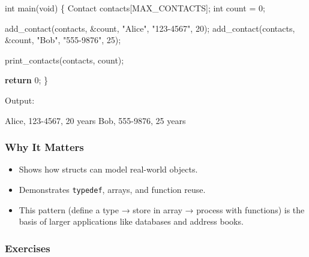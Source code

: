 \documentclass[
  letterpaper,
  DIV=11,
  numbers=noendperiod]{scrreprt}
\newenvironment{Shaded}{\begin{snugshade}}{\end{snugshade}}
\newcommand{\ControlFlowTok}[1]{\textcolor[rgb]{0.00,0.23,0.31}{\textbf{#1}}}
\newcommand{\DataTypeTok}[1]{\textcolor[rgb]{0.68,0.00,0.00}{#1}}
\newcommand{\DecValTok}[1]{\textcolor[rgb]{0.68,0.00,0.00}{#1}}
\newcommand{\ExtensionTok}[1]{\textcolor[rgb]{0.00,0.23,0.31}{#1}}
\newcommand{\NormalTok}[1]{\textcolor[rgb]{0.00,0.23,0.31}{#1}}
\newcommand{\OperatorTok}[1]{\textcolor[rgb]{0.37,0.37,0.37}{#1}}
\newcommand{\StringTok}[1]{\textcolor[rgb]{0.13,0.47,0.30}{#1}}
\providecommand{\tightlist}{%
  \setlength{\itemsep}{0pt}\setlength{\parskip}{0pt}}
\begin{document}
\begin{Shaded}
\begin{Highlighting}[]
\DataTypeTok{int}\NormalTok{ main}\OperatorTok{(}\DataTypeTok{void}\OperatorTok{)} \OperatorTok{\{}
\NormalTok{    Contact contacts}\OperatorTok{[}\NormalTok{MAX\_CONTACTS}\OperatorTok{];}
    \DataTypeTok{int}\NormalTok{ count }\OperatorTok{=} \DecValTok{0}\OperatorTok{;}

\NormalTok{    add\_contact}\OperatorTok{(}\NormalTok{contacts}\OperatorTok{,} \OperatorTok{\&}\NormalTok{count}\OperatorTok{,} \StringTok{"Alice"}\OperatorTok{,} \StringTok{"123{-}4567"}\OperatorTok{,} \DecValTok{20}\OperatorTok{);}
\NormalTok{    add\_contact}\OperatorTok{(}\NormalTok{contacts}\OperatorTok{,} \OperatorTok{\&}\NormalTok{count}\OperatorTok{,} \StringTok{"Bob"}\OperatorTok{,} \StringTok{"555{-}9876"}\OperatorTok{,} \DecValTok{25}\OperatorTok{);}

\NormalTok{    print\_contacts}\OperatorTok{(}\NormalTok{contacts}\OperatorTok{,}\NormalTok{ count}\OperatorTok{);}

    \ControlFlowTok{return} \DecValTok{0}\OperatorTok{;}
\OperatorTok{\}}
\end{Highlighting}
\end{Shaded}

Output:

\begin{Shaded}
\begin{Highlighting}[]
\ExtensionTok{Alice,}\NormalTok{ 123{-}4567, 20 years}
\ExtensionTok{Bob,}\NormalTok{ 555{-}9876, 25 years}
\end{Highlighting}
\end{Shaded}

\subsubsection{Why It Matters}\label{why-it-matters-38}

\begin{itemize}
\tightlist
\item
  Shows how structs can model real-world objects.
\item
  Demonstrates \texttt{typedef}, arrays, and function reuse.
\item
  This pattern (define a type → store in array → process with functions)
  is the basis of larger applications like databases and address books.
\end{itemize}

\subsubsection{Exercises}\label{exercises-39}
\end{document}

